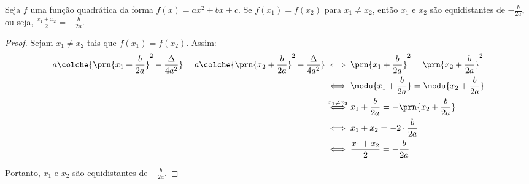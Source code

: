 \begin{proposition}
Seja $f$ uma função quadrática da forma $f(x) = ax^2 + bx +c$. Se
$f(x_1) = f(x_2)$ para $x_1 \neq x_2$, então $x_1$ e $x_2$ são
equidistantes de $-\frac{b} {2a}$, ou seja, $\frac{x_1 +x_2} 2 =
-\frac{b}{2a}$.
\end{proposition}

\begin{proof}
    Sejam $x_1 \ne x_2$ tais que $f(x_1) = f(x_2)$. Assim:
    \begin{align*}
        a\colche{ \prn{x_1+\frac{b}{2a}}^2 - \frac{\Delta}{4a^2}  } = a\colche{ \prn{x_2+\frac{b}{2a}}^2 - \frac{\Delta}{4a^2}  }
        &\iff \prn{x_1+\frac b {2a}}^2 = \prn{x_2+\frac b {2a}}^2 \\ 
        &\iff \modu{x_1 + \frac b {2a}} = \modu{x_2 + \frac b {2a}} \\ 
        &\stackrel{x_1 \ne x_2}{\iff} x_1 + \frac b {2a} = -\prn{x_2 + \frac b {2a}}  \\
        &\iff x_1 + x_2 = - 2 \cdot \frac b {2a} \\
        &\iff \frac{x_1+x_2} 2 = -\frac b {2a}
    \end{align*}

    Portanto, $x_1$ e $x_2$ são equidistantes de $-\frac b {2a}$.
\end{proof}